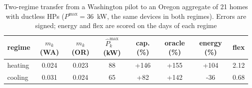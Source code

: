 \begin{table}[t]
\centering
\caption{Two-regime transfer from a Washington pilot to an Oregon aggregate of 21 homes with ductless HPs ($P^{\max} = 36$~kW, the same devices in both regimes). Errors are signed; energy and flex are scored on the days of each regime}
\label{tab:neea}
\setlength{\tabcolsep}{3pt}
\begin{tabular}{lccccccc}
\toprule
regime & $m_k$ (WA) & $m_k$ (OR) & $\hat{P}_k^{\max}$ (kW) & cap. (\%) & oracle (\%) & energy (\%) & flex \\
\midrule
heating & 0.024 & 0.023 & 88 & +146 & +155 & +104 & 2.12 \\
cooling & 0.031 & 0.024 & 65 & +82 & +142 & -36 & 0.68 \\
\bottomrule
\end{tabular}
\end{table}